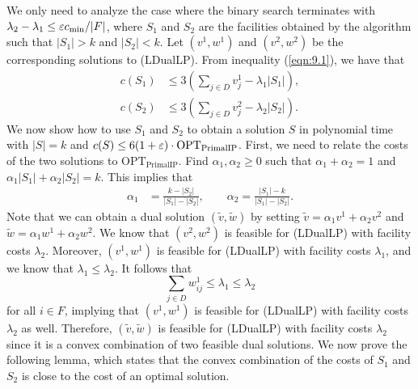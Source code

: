 We only need to analyze the case where the binary search 
terminates with $\lambda_2 - \lambda_1 \leq \varepsilon c_{\min}/|F|$, 
where $S_1$ and $S_2$ are the facilities obtained by the algorithm such that 
$|S_1| > k$ and $|S_2| < k$. Let $(v^1, w^1)$ and $(v^2, w^2)$ be the 
corresponding solutions to (LDualLP). From inequality (\ref{eqn:9.1}), we have that 
\begin{align}
    c(S_1) &\leq 3 \left( \sum_{j\in D} v_j^1 - \lambda_1 |S_1| \right), \label{eqn:9.2} \\
    c(S_2) &\leq 3 \left( \sum_{j\in D} v_j^2 - \lambda_2 |S_2| \right). \label{eqn:9.3}
\end{align}
We now show how to use $S_1$ and $S_2$ to obtain a solution $S$ in 
polynomial time with $|S| = k$ and $c(S) \leq 6(1+\varepsilon) \cdot 
\text{OPT}_{\text{PrimalIP}}$. First, we need to relate the costs 
of the two solutions to $\text{OPT}_{\text{PrimalIP}}$. Find 
$\alpha_1, \alpha_2 \geq 0$ such that $\alpha_1 + \alpha_2 = 1$ and 
$\alpha_1|S_1| + \alpha_2|S_2| = k$. This implies that 
\begin{align*}
    \alpha_1 &= \frac{k-|S_2|}{|S_1|-|S_2|}, \qquad \alpha_2 
    = \frac{|S_1|-k}{|S_1|-|S_2|}. 
\end{align*} 
Note that we can obtain a dual solution $(\tilde v, \tilde w)$ by setting 
$\tilde v = \alpha_1 v^1 + \alpha_2 v^2$ and $\tilde w = 
\alpha_1 w^1 + \alpha_2 w^2$. We know that $(v^2, w^2)$ is 
feasible for (LDualLP) with facility costs $\lambda_2$. Moreover, 
$(v^1, w^1)$ is feasible for (LDualLP) with facility costs $\lambda_1$, 
and we know that $\lambda_1 \leq \lambda_2$. It follows that 
\[ \sum_{j\in D} w_{ij}^1 \leq \lambda_1 \leq \lambda_2 \] 
for all $i \in F$, implying that $(v^1, w^1)$ is feasible for (LDualLP) with facility 
costs $\lambda_2$ as well. Therefore, $(\tilde v, \tilde w)$ is feasible for 
(LDualLP) with facility costs $\lambda_2$ since it is a convex combination of 
two feasible dual solutions. We now prove the following lemma, 
which states that the convex combination of the costs of $S_1$ and $S_2$ 
is close to the cost of an optimal solution.

